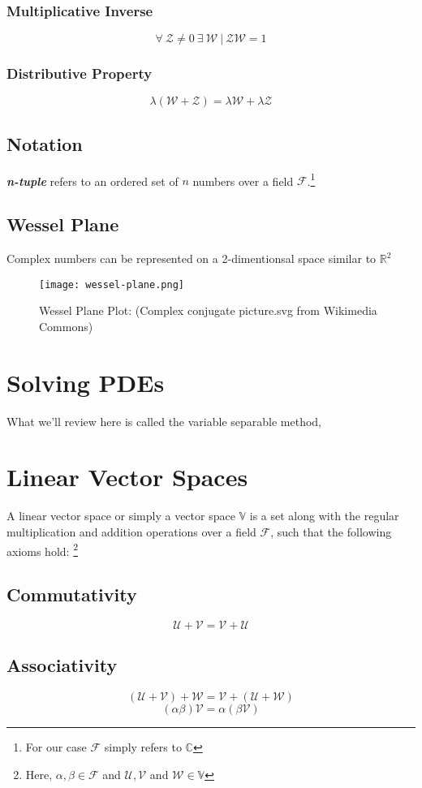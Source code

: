\subsubsection{Multiplicative Inverse}
$$\forall \  \mathcal{Z} \neq 0 \ \exists \ \mathcal{W} \ | \ \mathcal{Z}\mathcal{W} = 1$$
\subsubsection{Distributive Property}
$$\lambda(\mathcal{W} + \mathcal{Z}) = \lambda\mathcal{W} + \lambda\mathcal{Z}$$
\subsection{Notation}
\textit{\textbf{n-tuple}} refers to an ordered set of $n$ numbers over a field $\mathcal{F}$.\footnote{For our case $\mathcal{F}$ simply refers to $\mathbb{C}$}
\subsection{Wessel Plane}
Complex numbers can be represented on a 2-dimentionsal space similar to $\mathbb{R}^{2}$
\begin{figure}[h]
	\centering
	\texttt{[image: wessel-plane.png]}
	\caption{Wessel Plane Plot: (Complex conjugate picture.svg from Wikimedia Commons)}
\end{figure}
\section{Solving PDEs}
What we'll review here is called the variable separable method, 
\section{Linear Vector Spaces} 
A linear vector space or simply a vector space $\mathbb{V}$ is a set along with the regular multiplication and addition operations over a field $\mathcal{F}$, such that the following axioms hold: \footnote{Here, $\alpha , \beta \in \mathcal{F}$ and $\mathcal{U}, \mathcal{V} $ and $\mathcal{W} \in \mathbb{V}$} \\
\subsection{Commutativity}
$$\mathcal{U} + \mathcal{V} = \mathcal{V} + \mathcal{U}$$
\subsection{Associativity}
$$(\mathcal{U} + \mathcal{V}) + \mathcal{W} = \mathcal{V} + (\mathcal{U} + \mathcal{W})$$
$$(\alpha \beta) \mathcal{V} = \alpha (\beta \mathcal{V})$$
